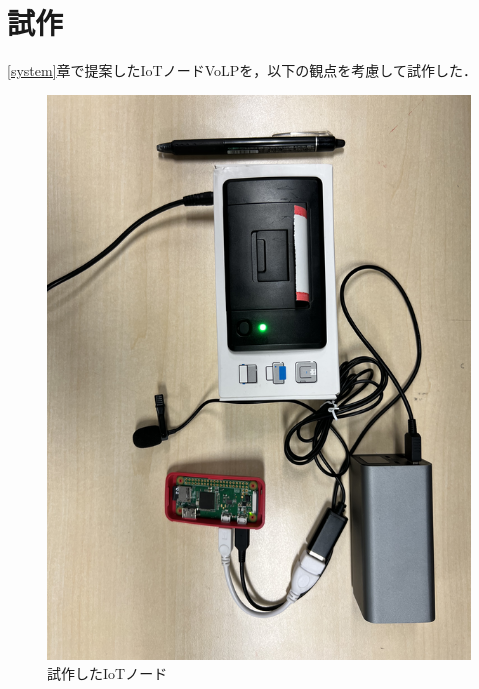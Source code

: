\documentclass[submit,techrep,noauthor]{ipsj}
\begin{document}
\section{試作}
\ref{system}章で提案したIoTノードVoLPを，以下の観点を考慮して試作した． 

\begin{figure}[tb]
\includegraphics[scale=0.35,bb= 0 0 2000 1000]{image/device.png}
\caption{試作したIoTノード}
\label{fig:device}
\end{figure}
\end{document}
